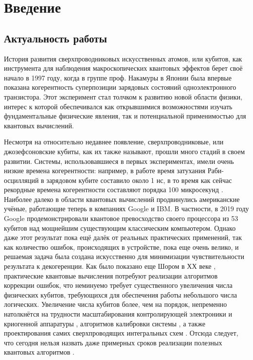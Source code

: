 \documentclass[14pt, a4paper]{extreport}
\numberwithin{equation}{section}
\begin{document}
\chapter*{Введение}

\section*{Актуальность работы}

История развития сверхпроводниковых искусственных атомов, или кубитов, как инструмента для наблюдения макроскопических квантовых эффектов берет своё начало в 1997 году, когда в группе проф. Накамуры в Японии была впервые показана \cite{nakamura1997spectroscopy} когерентность суперпозиции зарядовых состояний одноэлектронного транзистора. Этот эксперимент стал толчком к развитию новой области физики, интерес к которой обеспечивался как открывшимися возможностями изучать фундаментальные физические явления, так и потенциальной применимостью для квантовых вычислений.

Несмотря на относительно недавнее появление, сверхпроводниковые, или джозефсоновские кубиты, как их также называют, прошли много стадий в своем развитии. Системы, использовавшиеся в первых экспериментах, имели очень низкие времена когерентности: например, в работе \cite{nakamura1999coherent} время затухания Раби-осцилляций в зарядовом кубите составило около 1 нс, в то время как сейчас рекордные времена когерентности составляют порядка 100 микросекунд \cite{kjaergaard2020superconducting}. Наиболее далеко в области квантовых вычислений продвинулись американские учёные, работающие теперь в компаниях Google и IBM. В частности, в 2019 году Google продемонстрировали \cite{arute2019quantum} квантовое превосходство своего процессора из 53 кубитов над мощнейшим существующим классическим компьютером. Однако даже этот результат пока ещё далёк от реальных практических применений, так как количество ошибок, происходящих в устройстве, пока еще очень велико, и решаемая задача была создана искусственно для минимизации чувствительности результата к декогеренции. Как было показано еще Шором в ХХ веке \cite{shor1995scheme}, практические квантовые вычисления потребуют реализации алгоритмов коррекции ошибок, что неминуемо требует существенного увеличения числа физических кубитов, требующихся для обеспечения работы небольшого числа логических. Увеличение числа кубитов более, чем на порядок, непременно натолкнётся на трудности масштабирования контролирующей электроники и криогенной аппаратуры \cite{krinner2019engineering}, алгоритмов калибровки системы \cite{arute2019quantum, kelly2018physical}, а также проектирования самих сверхпроводящих интегральных схем \cite{hutchings2017tunable}. Отсюда следует, что сегодня нельзя назвать даже примерных сроков реализации полезных квантовых алгоритмов \cite{arute2019quantum}.
\end{document}
